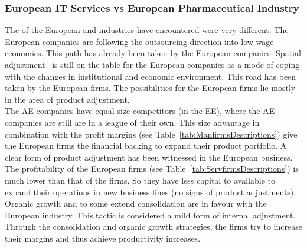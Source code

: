 \subsubsection{European IT Services vs European Pharmaceutical Industry}
The \cc of the European \manu and \its industries have encountered were very different.
The European \pharma companies are following the outsourcing direction into low wage economies. 
This path has already been taken by the European \its companies.
Spatial adjustment~\citep{Lawton:2009vw} is still on the table for the European \pharma companies as a mode of coping with the changes in institutional and economic environment.
This road has been taken by the European \its firms.
The possibilities for the European \its firms lie mostly in the area of product adjustment.\\
The AE \its companies have equal size competitors (in the EE), where the AE \pharma companies are still are in a league of their own.
This size advantage in combination with the profit margins (see Table~\ref{tab:ManfirmsDescriptions}) give the European firms the financial backing to expand their product portfolio.
A clear form of product adjustment has been witnessed in the European \pharma business.
The profitability of the European \its firms (see Table~\ref{tab:ServfirmsDescriptions}) is much lower than that of the \pharma firms.
So they have less capital to available to expand their operations in new business lines (no signs of product adjustments).
Organic growth and to some extend consolidation are in favour with the European \its industry.
This tactic is considered a mild form of internal adjustment.
Through the consolidation and organic growth strategies, the \its firms try to increase their margins and thus achieve productivity increases. 


